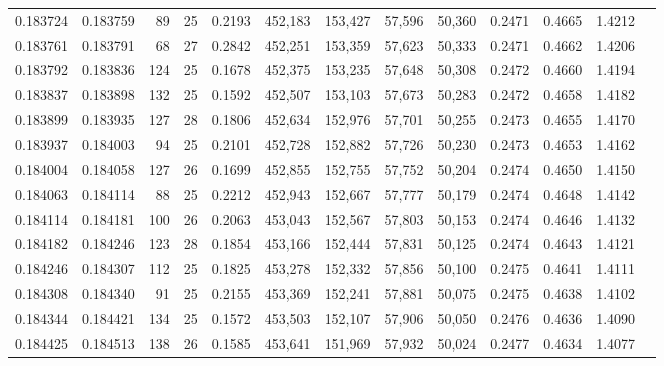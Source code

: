\begin{tabular}{rrrrrrrrrrrrr}
0.183724 & 0.183759 &  89 &  25 &                                     0.2193 & 452,183 & 153,427 &  57,596 &  50,360 & 0.2471 & 0.4665 & 1.4212 \\
0.183761 & 0.183791 &  68 &  27 &                                     0.2842 & 452,251 & 153,359 &  57,623 &  50,333 & 0.2471 & 0.4662 & 1.4206 \\
0.183792 & 0.183836 & 124 &  25 &                                     0.1678 & 452,375 & 153,235 &  57,648 &  50,308 & 0.2472 & 0.4660 & 1.4194 \\
0.183837 & 0.183898 & 132 &  25 &                                     0.1592 & 452,507 & 153,103 &  57,673 &  50,283 & 0.2472 & 0.4658 & 1.4182 \\
0.183899 & 0.183935 & 127 &  28 &                                     0.1806 & 452,634 & 152,976 &  57,701 &  50,255 & 0.2473 & 0.4655 & 1.4170 \\
0.183937 & 0.184003 &  94 &  25 &                                     0.2101 & 452,728 & 152,882 &  57,726 &  50,230 & 0.2473 & 0.4653 & 1.4162 \\
0.184004 & 0.184058 & 127 &  26 &                                     0.1699 & 452,855 & 152,755 &  57,752 &  50,204 & 0.2474 & 0.4650 & 1.4150 \\
0.184063 & 0.184114 &  88 &  25 &                                     0.2212 & 452,943 & 152,667 &  57,777 &  50,179 & 0.2474 & 0.4648 & 1.4142 \\
0.184114 & 0.184181 & 100 &  26 &                                     0.2063 & 453,043 & 152,567 &  57,803 &  50,153 & 0.2474 & 0.4646 & 1.4132 \\
0.184182 & 0.184246 & 123 &  28 &                                     0.1854 & 453,166 & 152,444 &  57,831 &  50,125 & 0.2474 & 0.4643 & 1.4121 \\
0.184246 & 0.184307 & 112 &  25 &                                     0.1825 & 453,278 & 152,332 &  57,856 &  50,100 & 0.2475 & 0.4641 & 1.4111 \\
0.184308 & 0.184340 &  91 &  25 &                                     0.2155 & 453,369 & 152,241 &  57,881 &  50,075 & 0.2475 & 0.4638 & 1.4102 \\
0.184344 & 0.184421 & 134 &  25 &                                     0.1572 & 453,503 & 152,107 &  57,906 &  50,050 & 0.2476 & 0.4636 & 1.4090 \\
0.184425 & 0.184513 & 138 &  26 &                                     0.1585 & 453,641 & 151,969 &  57,932 &  50,024 & 0.2477 & 0.4634 & 1.4077 \\

\end{tabular}
